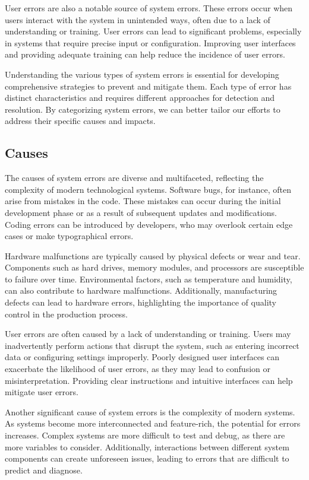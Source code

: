 \documentclass[10pt, conference, letterpaper]{IEEEtran}
\begin{document}
User errors are also a notable source of system errors. These errors occur when users interact with the system in unintended ways, often due to a lack of understanding or training. User errors can lead to significant problems, especially in systems that require precise input or configuration. Improving user interfaces and providing adequate training can help reduce the incidence of user errors.

Understanding the various types of system errors is essential for developing comprehensive strategies to prevent and mitigate them. Each type of error has distinct characteristics and requires different approaches for detection and resolution. By categorizing system errors, we can better tailor our efforts to address their specific causes and impacts.

\subsection{Causes}
The causes of system errors are diverse and multifaceted, reflecting the complexity of modern technological systems. Software bugs, for instance, often arise from mistakes in the code. These mistakes can occur during the initial development phase or as a result of subsequent updates and modifications. Coding errors can be introduced by developers, who may overlook certain edge cases or make typographical errors.

Hardware malfunctions are typically caused by physical defects or wear and tear. Components such as hard drives, memory modules, and processors are susceptible to failure over time. Environmental factors, such as temperature and humidity, can also contribute to hardware malfunctions. Additionally, manufacturing defects can lead to hardware errors, highlighting the importance of quality control in the production process.

User errors are often caused by a lack of understanding or training. Users may inadvertently perform actions that disrupt the system, such as entering incorrect data or configuring settings improperly. Poorly designed user interfaces can exacerbate the likelihood of user errors, as they may lead to confusion or misinterpretation. Providing clear instructions and intuitive interfaces can help mitigate user errors.

Another significant cause of system errors is the complexity of modern systems. As systems become more interconnected and feature-rich, the potential for errors increases. Complex systems are more difficult to test and debug, as there are more variables to consider. Additionally, interactions between different system components can create unforeseen issues, leading to errors that are difficult to predict and diagnose.
\end{document}
